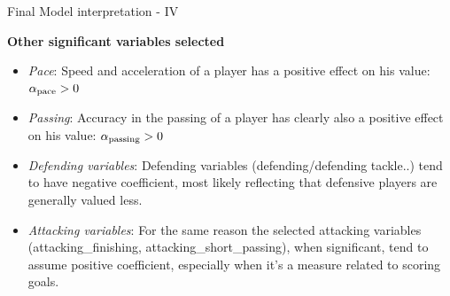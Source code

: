 \documentclass[aspectratio=169,xcolor=dvipsnames]{beamer}
\begin{document}
\begin{frame}{Final Model interpretation - IV}

\begin{large}
\begin{center}
\textbf{Other significant variables selected}
\end{center}
\end{large}

\vspace{5mm}
\begin{itemize}
    \item \textit{Pace}: Speed and acceleration of a player has a positive effect on his value: $\alpha\textsubscript{pace} > 0$
    
    \item \textit{Passing}: Accuracy in the passing of a player has clearly also a positive effect on his value:  $\alpha\textsubscript{passing} > 0$
    
    \item \textit{Defending variables}: Defending variables (defending/defending tackle..) tend to have negative coefficient, most likely reflecting that defensive players are generally valued less.
    
    \item \textit{Attacking variables}: For the same reason the selected attacking variables (attacking\_finishing, attacking\_short\_passing), when significant, tend to assume positive coefficient, especially when it's a measure related to scoring goals.
\end{itemize}
\end{frame}

\end{document}
